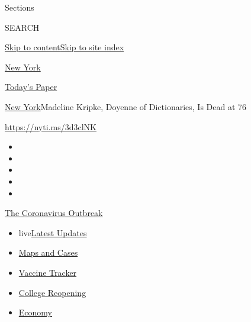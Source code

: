 Sections

SEARCH

\protect\hyperlink{site-content}{Skip to
content}\protect\hyperlink{site-index}{Skip to site index}

\href{https://www.nytimes3xbfgragh.onion/section/nyregion}{New York}

\href{https://myaccount.nytimes3xbfgragh.onion/auth/login?response_type=cookie\&client_id=vi}{}

\href{https://www.nytimes3xbfgragh.onion/section/todayspaper}{Today's
Paper}

\href{/section/nyregion}{New York}\textbar{}Madeline Kripke, Doyenne of
Dictionaries, Is Dead at 76

\url{https://nyti.ms/3d3clNK}

\begin{itemize}
\item
\item
\item
\item
\item
\end{itemize}

\href{https://www.nytimes3xbfgragh.onion/news-event/coronavirus?action=click\&pgtype=Article\&state=default\&region=TOP_BANNER\&context=storylines_menu}{The
Coronavirus Outbreak}

\begin{itemize}
\tightlist
\item
  live\href{https://www.nytimes3xbfgragh.onion/2020/08/04/world/coronavirus-covid-19.html?action=click\&pgtype=Article\&state=default\&region=TOP_BANNER\&context=storylines_menu}{Latest
  Updates}
\item
  \href{https://www.nytimes3xbfgragh.onion/interactive/2020/us/coronavirus-us-cases.html?action=click\&pgtype=Article\&state=default\&region=TOP_BANNER\&context=storylines_menu}{Maps
  and Cases}
\item
  \href{https://www.nytimes3xbfgragh.onion/interactive/2020/science/coronavirus-vaccine-tracker.html?action=click\&pgtype=Article\&state=default\&region=TOP_BANNER\&context=storylines_menu}{Vaccine
  Tracker}
\item
  \href{https://www.nytimes3xbfgragh.onion/2020/08/02/us/covid-college-reopening.html?action=click\&pgtype=Article\&state=default\&region=TOP_BANNER\&context=storylines_menu}{College
  Reopening}
\item
  \href{https://www.nytimes3xbfgragh.onion/live/2020/08/03/business/stock-market-today-coronavirus?action=click\&pgtype=Article\&state=default\&region=TOP_BANNER\&context=storylines_menu}{Economy}
\end{itemize}


